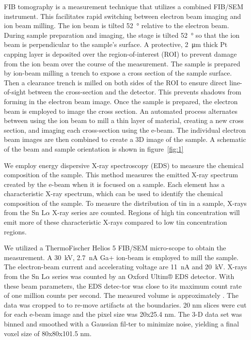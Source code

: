 FIB tomography is a measurement technique that utilizes a combined FIB/SEM instrument. This facilitates rapid switching between electron beam imaging and ion beam milling. The ion beam is tilted \qty{52}{\degree} relative to the electron beam. During sample preparation and imaging, the stage is tilted \qty{52}{\degree} so that the ion beam is perpendicular to the sample's surface. A protective, \qty{2}{\micro\meter} thick Pt capping layer is deposited over the region-of-interest (ROI) to prevent damage from the ion beam over the course of the measurement. The sample is prepared by ion-beam milling a trench to expose a cross section of the sample surface. Then a clearance trench is milled on both sides of the ROI to ensure direct line-of-sight between the cross-section and the detector. This prevents shadows from forming in the electron beam image. Once the sample is prepared, the electron beam is employed to image the cross section. An automated process alternates between using the ion beam to mill a thin layer of material, creating a new cross section, and imaging each cross-section using the e-beam. The individual electron beam images are then combined to create a 3D image of the sample. A schematic of the beam and sample orientation is shown in figure~\ref{fig:1}

We employ energy dispersive X-ray spectroscopy (EDS) to measure the chemical composition of the sample. This method measures the emitted X-ray spectrum created by the e-beam when it is focused on a sample. Each element has a characteristic X-ray spectrum, which can be used to identify the chemical composition of the sample. To measure the distribution of tin in a sample, X-rays from the Sn L$\alpha$ X-ray series are counted. Regions of high tin concentration will emit more of these characteristic X-rays compared to low tin concentration regions.

We utilized a ThermoFischer Helios 5 FIB/SEM micro-scope to obtain the measurement. A \qty{30}{\kilo\volt}, \qty{2.7}{\nano\ampere} Ga+ ion-beam is employed to mill the sample. The electron-beam current and accelerating voltage are \qty{11}{\nano\ampere} and \qty{20}{\kilo\volt}. X-rays from the Sn L$\alpha$ series was counted by an Oxford Ultim® EDS detector. With these beam parameters, the EDS detec-tor was close to its maximum count rate of one million counts per second. The measured volume is approximately . The data was cropped to  to re-move artifacts at the boundaries.  20 nm slices were cut for each e-beam image and the pixel size was 20x25.4 nm. The 3-D data set was binned and smoothed with a Gaussian fil-ter to minimize noise, yielding a final voxel size of 80x80x101.5 nm.

